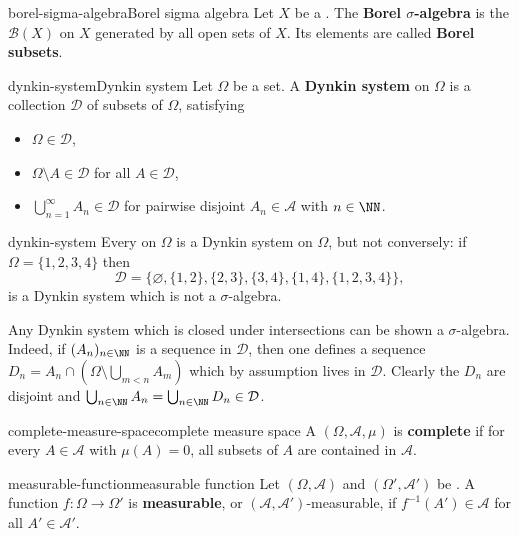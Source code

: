 \begin{topic}{borel-sigma-algebra}{Borel sigma algebra}
    Let $X$ be a . The \textbf{Borel $\sigma$-algebra} is the  $\mathcal{B}(X)$ on $X$ generated by all open sets of $X$. Its elements are called \textbf{Borel subsets}.
\end{topic}

\begin{topic}{dynkin-system}{Dynkin system}
    Let $\Omega$ be a set. A \textbf{Dynkin system} on $\Omega$ is a collection $\mathcal{D}$ of subsets of $\Omega$, satisfying
    \begin{itemize}
        \item $\Omega \in \mathcal{D}$,
        \item $\Omega \setminus A \in \mathcal{D}$ for all $A \in \mathcal{D}$,
        \item $\bigcup_{n = 1}^\infty A_n \in \mathcal{D}$ for pairwise disjoint $A_n \in \mathcal{A}$ with $n \in \NN$.
    \end{itemize}
\end{topic}

\begin{example}{dynkin-system}
    Every  on $\Omega$ is a Dynkin system on $\Omega$, but not conversely: if $\Omega = \{ 1, 2, 3, 4 \}$ then
    \[ \mathcal{D} = \{ \varnothing, \{ 1, 2 \}, \{ 2, 3 \}, \{ 3, 4 \}, \{ 1, 4 \}, \{ 1, 2, 3, 4 \} \} , \]
    is a Dynkin system which is not a $\sigma$-algebra.

    Any Dynkin system which is closed under intersections can be shown a $\sigma$-algebra. Indeed, if $(A_n)_{n \in \NN}$ is a sequence in $\mathcal{D}$, then one defines a sequence $D_n = A_n \cap \left(\Omega \setminus \bigcup_{m < n} A_m \right)$ which by assumption lives in $\mathcal{D}$. Clearly the $D_n$ are disjoint and $\bigcup_{n \in \NN} A_n = \bigcup_{n \in \NN} D_n \in \mathcal{D}$.
\end{example}

\begin{topic}{complete-measure-space}{complete measure space}
    A  $(\Omega, \mathcal{A}, \mu)$ is \textbf{complete} if for every $A \in \mathcal{A}$ with $\mu(A) = 0$, all subsets of $A$ are contained in $\mathcal{A}$.
\end{topic}

\begin{topic}{measurable-function}{measurable function}
    Let $(\Omega, \mathcal{A})$ and $(\Omega', \mathcal{A}')$ be . A function $f : \Omega \to \Omega'$ is \textbf{measurable}, or $(\mathcal{A}, \mathcal{A}')$-measurable, if $f^{-1}(A') \in \mathcal{A}$ for all $A' \in \mathcal{A}'$.
\end{topic}

